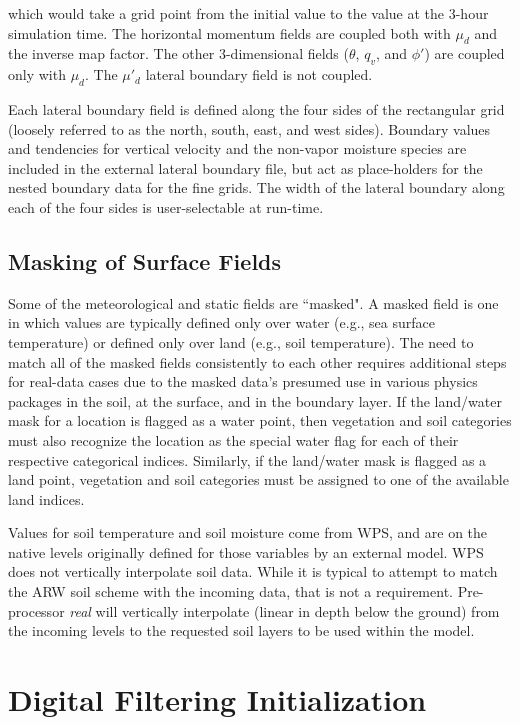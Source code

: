 \noindent which would take a grid point from the initial value to the value at the 3-hour simulation time. 
The horizontal momentum fields are coupled both with  $\mu_d$ and the inverse map factor.  The 
other 3-dimensional fields ($\theta$, $q_v$, and $\phi'$) are coupled only with $\mu_d$.
The $\mu'_d$ lateral boundary field is not coupled.

Each lateral boundary field
is defined along the four sides of the 
rectangular grid (loosely referred to as the north, south, east, and west sides).  
Boundary values and tendencies for vertical velocity and the non-vapor moisture species are included
in the external lateral boundary file, but act as
place-holders for the nested boundary data for the fine grids.
The width of the lateral
boundary along each of the four sides is user-selectable at run-time.

\subsection{Masking of Surface Fields}

Some of the meteorological and static fields are ``masked".  A masked field is one in which
values are typically defined only over water (e.g., sea surface temperature) or defined
only over land (e.g., soil temperature).
The need to match all of the masked fields consistently to each other requires additional steps
for real-data cases due to the masked data's presumed use in various physics packages in the soil, 
at the surface, and in the boundary layer.
If the land/water
mask for a location is flagged as a water point, then vegetation and soil categories must also
recognize the location as the special water flag for each of their respective categorical indices.  
Similarly, if the land/water mask is flagged as a land point, vegetation and soil
categories must be assigned to one of the available land indices.

Values for soil temperature and soil moisture come from WPS, and are on the 
native levels originally defined for those variables
by an external model.  WPS does not vertically interpolate
soil data.  While it is typical to attempt to match the ARW soil scheme with
the incoming data, that is not a requirement.  Pre-processor {\it real} will vertically interpolate 
(linear in depth below the ground) from the incoming levels to the requested soil layers to be
used within the model.

\section{Digital Filtering Initialization}


